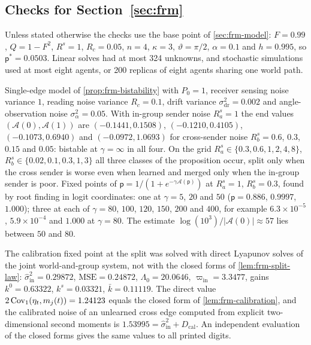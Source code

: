 \subsection{Checks for \texorpdfstring{Section~\ref{sec:frm}}{formation}}\label{chk:frm}

Unless stated otherwise the checks use the base point of \cref{sec:frm-model}: $F=0.99$, $Q=1-F^2$, $R^s=1$, $R_c=0.05$, $n=4$, $\kappa=3$, $\vartheta=\pi/2$, $\alpha=0.1$ and $h=0.995$, so $\mathsf p^\ast=0.0503$. Linear solves had at most 324 unknowns, and stochastic simulations used at most eight agents, or 200 replicas of eight agents sharing one world path.

\begin{numcheck}\label{chk:frm-bistability}
Single-edge model of \cref{prop:frm-bistability} with $P_0=1$, receiver sensing noise variance $1$, reading noise variance $R_c=0.1$, drift variance $\sigma^2_{\mathrm{dr}}=0.002$ and angle-observation noise $\sigma_\alpha^2=0.05$. With in-group sender noise $R^s_a=1$ the end values $(\mathcal A(0),\mathcal A(1))$ are $(-0.1441,0.1508)$, $(-0.1210,0.4105)$, $(-0.1073,0.6940)$ and $(-0.0972,1.0693)$ for cross-sender noise $R^s_b=0.6$, $0.3$, $0.15$ and $0.05$: bistable at $\gamma=\infty$ in all four. On the grid $R^s_a\in\{0.3,0.6,1,2,4,8\}$, $R^s_b\in\{0.02,0.1,0.3,1,3\}$ all three classes of the proposition occur, split only when the cross sender is worse even when learned and merged only when the in-group sender is poor. Fixed points of $\mathsf p=1/(1+e^{-\gamma\mathcal A(\mathsf p)})$ at $R^s_a=1$, $R^s_b=0.3$, found by root finding in logit coordinates: one at $\gamma=5$, $20$ and $50$ ($\mathsf p=0.886$, $0.9997$, $1.000$); three at each of $\gamma=80$, $100$, $120$, $150$, $200$ and $400$, for example $6.3\times10^{-5}$, $5.9\times10^{-4}$ and $1.000$ at $\gamma=80$. The estimate $\log(10^3)/\vert\mathcal A(0)\vert\approx57$ lies between $50$ and $80$.
\end{numcheck}

\begin{numcheck}\label{chk:frm-calibration}
The calibration fixed point at the split was solved with direct Lyapunov solves of the joint world-and-group system, not with the closed forms of \cref{lem:frm-split-law}: $\hat\sigma^2_{\mathrm{in}}=0.29872$, $\mathrm{MSE}=0.24872$, $\Lambda_0=20.0646$, $\varpi_{\mathrm{in}}=3.3477$, gains $k^0=0.63322$, $k^s=0.03321$, $\bar k=0.11119$. The direct value $2\operatorname{Cov}_1(\eta_t,m_j(t))=1.24123$ equals the closed form of \cref{lem:frm-calibration}, and the calibrated noise of an unlearned cross edge computed from explicit two-dimensional second moments is $1.53995=\hat\sigma^2_{\mathrm{in}}+D_{\mathrm{cal}}$. An independent evaluation of the closed forms gives the same values to all printed digits.
\end{numcheck}

